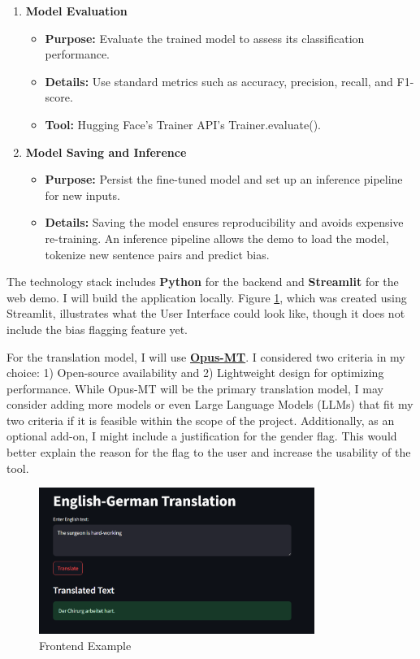 \documentclass[oneside, paper=A4, DIV=15]{scrartcl}
\begin{document}
\begin{description}
\begin{enumerate}
    \item \textbf{Model Evaluation}
    \begin{itemize}
        \item \textbf{Purpose:} Evaluate the trained model to assess its classification performance.
        \item \textbf{Details:} Use standard metrics such as accuracy, precision, recall, and F1-score.
        \item \textbf{Tool:} Hugging Face's Trainer API's Trainer.evaluate().
    \end{itemize}
    
    \item \textbf{Model Saving and Inference}
    \begin{itemize}
        \item \textbf{Purpose:} Persist the fine-tuned model and set up an inference pipeline for new inputs.
        \item \textbf{Details:}  
        Saving the model ensures reproducibility and avoids expensive re-training.  
        An inference pipeline allows the demo to load the model, tokenize new sentence pairs and predict bias.
    \end{itemize}
\end{enumerate}


The technology stack includes \textbf{Python} for the backend and \textbf{Streamlit} for the web demo. I will build the application locally. Figure \ref{fig:demo_image}, which was created using Streamlit, illustrates what the User Interface could look like, though it does not include the bias flagging feature yet.


For the translation model, I will use \textbf{\href{https://github.com/Helsinki-NLP/Opus-MT?tab=readme-ov-file}{Opus-MT}}. I considered two criteria in my choice: 1) Open-source availability and 2) Lightweight design for optimizing performance. While Opus-MT will be the primary translation model, I may consider adding more models or even Large Language Models (LLMs) that fit my two criteria if it is feasible within the scope of the project. Additionally, as an optional add-on, I might include a justification for the gender flag. This would better explain the reason for the flag to the user and increase the usability of the tool.

\begin{figure}[htbp]
    \centering
    \includegraphics[width=0.8\textwidth]{images/Screenshot_Frontend.png}
    \caption{Frontend Example}
    \label{fig:demo_image}
\end{figure}


\end{description}
\end{document}
